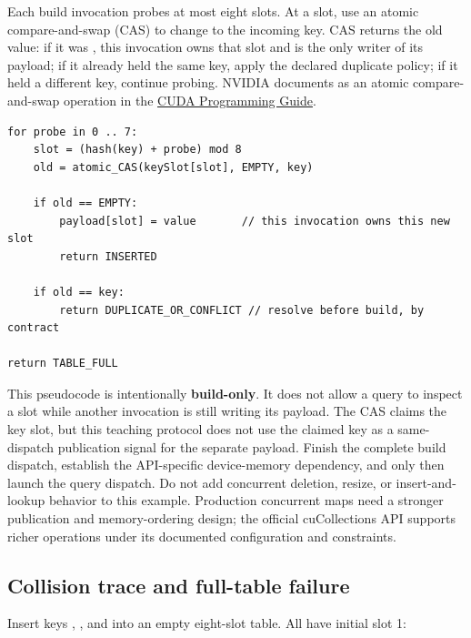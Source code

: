 Each build invocation probes at most eight slots. At a slot, use an atomic compare-and-swap (CAS) to change  to the incoming key. CAS returns the old value: if it was , this invocation owns that slot and is the only writer of its payload; if it already held the same key, apply the declared duplicate policy; if it held a different key, continue probing. NVIDIA documents  as an atomic compare-and-swap operation in the \href{https://docs.nvidia.com/cuda/cuda-programming-guide/pdf/cuda-programming-guide.pdf}{CUDA Programming Guide}.

\begin{verbatim}
for probe in 0 .. 7:
    slot = (hash(key) + probe) mod 8
    old = atomic_CAS(keySlot[slot], EMPTY, key)

    if old == EMPTY:
        payload[slot] = value       // this invocation owns this new slot
        return INSERTED

    if old == key:
        return DUPLICATE_OR_CONFLICT // resolve before build, by contract

return TABLE_FULL
\end{verbatim}

This pseudocode is intentionally \textbf{build-only}. It does not allow a query to inspect a slot while another invocation is still writing its payload. The CAS claims the key slot, but this teaching protocol does not use the claimed key as a same-dispatch publication signal for the separate payload. Finish the complete build dispatch, establish the API-specific device-memory dependency, and only then launch the query dispatch. Do not add concurrent deletion, resize, or insert-and-lookup behavior to this example. Production concurrent maps need a stronger publication and memory-ordering design; the official cuCollections API supports richer operations under its documented configuration and constraints.

\subsection{Collision trace and full-table failure}\label{03-visual-computing-i-ch016-collision-trace-and-full-table-failure}

\hypertarget{03-visual-computing-i-ch016-collision-trace-and-full-table-failure}{}

Insert keys , , and  into an empty eight-slot table. All have initial slot 1:

